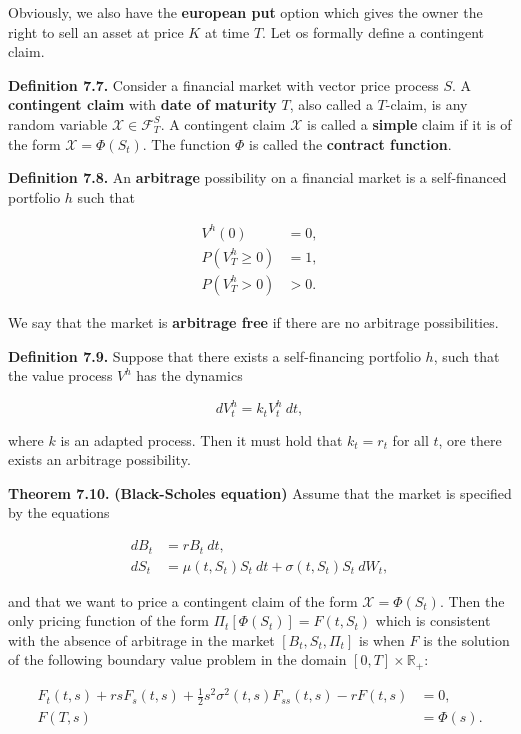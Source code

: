 \documentclass[
]{article}
\begin{document}
Obviously, we also have the \textbf{european put} option which gives the
owner the right to sell an asset at price \(K\) at time \(T\). Let os
formally define a contingent claim.

\textbf{Definition 7.7.} Consider a financial market with vector price
process \(S\). A \textbf{contingent claim} with \textbf{date of
maturity} \(T\), also called a \(T\)-claim, is any random variable
\(\mathcal{X}\in\mathcal{F}_T^S\). A contingent claim \(\mathcal{X}\) is
called a \textbf{simple} claim if it is of the form
\(\mathcal{X} = \Phi(S_t)\). The function \(\Phi\) is called the
\textbf{contract function}.

\textbf{Definition 7.8.} An \textbf{arbitrage} possibility on a
financial market is a self-financed portfolio \(h\) such that

\begin{align*}
V^h(0)&=0,\\
P(V_T^h\ge0)&=1,\\
P(V_T^h>0)&>0.
\end{align*}

We say that the market is \textbf{arbitrage free} if there are no
arbitrage possibilities.

\textbf{Definition 7.9.} Suppose that there exists a self-financing
portfolio \(h\), such that the value process \(V^h\) has the dynamics

\[
d V_t^h=k_tV_t^h\ dt,
\]

where \(k\) is an adapted process. Then it must hold that \(k_t=r_t\)
for all \(t\), ore there exists an arbitrage possibility.

\textbf{Theorem 7.10.} \textbf{(Black-Scholes equation)} Assume that the
market is specified by the equations

\begin{align*}
dB_t&=rB_t\ dt,\\
dS_t&=\mu(t,S_t) S_t\ dt+\sigma(t,S_t)S_t\ dW_t,
\end{align*}

and that we want to price a contingent claim of the form
\(\mathcal{X}=\Phi(S_t)\). Then the only pricing function of the form
\(\Pi_t[\Phi(S_t)]=F(t,S_t)\) which is consistent with the absence of
arbitrage in the market \([B_t,S_t,\Pi_t]\) is when \(F\) is the
solution of the following boundary value problem in the domain
\([0,T]\times\mathbb{R}_+\):

\begin{align*}
F_t(t,s)+rsF_s(t,s)+\frac{1}{2}s^2\sigma^2(t,s)F_{ss}(t,s)-rF(t,s)&=0,\\
F(T,s)&=\Phi(s).
\end{align*}
\end{document}
